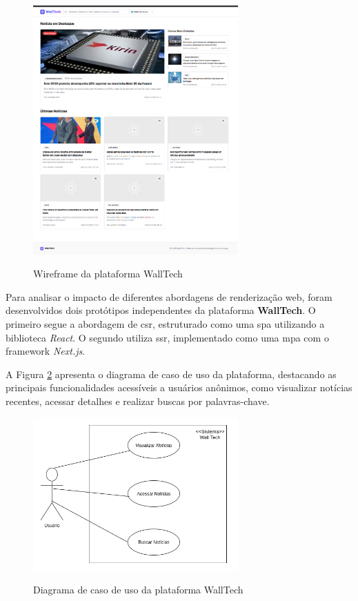 \begin{figure}[H]
  \centering
  \caption{Wireframe da plataforma WallTech}
  \includegraphics[width=0.7\textwidth]{media/wall_tech_wireframe.png}
  \label{fig:wireframe-walltech}
\end{figure}

Para analisar o impacto de diferentes abordagens de renderização web, foram desenvolvidos dois protótipos independentes da plataforma \textbf{WallTech}. O primeiro segue a abordagem de \acrfull{csr}, estruturado como uma \acrfull{spa} utilizando a biblioteca \textit{React}. O segundo utiliza \acrfull{ssr}, implementado como uma \acrfull{mpa} com o framework \textit{Next.js}.

A Figura \ref{fig:caso-uso-walltech} apresenta o diagrama de caso de uso da plataforma, destacando as principais funcionalidades acessíveis a usuários anônimos, como visualizar notícias recentes, acessar detalhes e realizar buscas por palavras-chave.

\begin{figure}[H]
  \centering
  \caption{Diagrama de caso de uso da plataforma WallTech}
  \includegraphics[width=0.7\textwidth]{media/wall_tech_use_case.png}
  \label{fig:caso-uso-walltech}
\end{figure}


